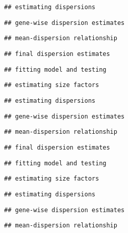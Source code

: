\documentclass[
]{article}
\begin{document}
\begin{verbatim}
## estimating dispersions
\end{verbatim}

\begin{verbatim}
## gene-wise dispersion estimates
\end{verbatim}

\begin{verbatim}
## mean-dispersion relationship
\end{verbatim}

\begin{verbatim}
## final dispersion estimates
\end{verbatim}

\begin{verbatim}
## fitting model and testing
\end{verbatim}

\begin{verbatim}
## estimating size factors
\end{verbatim}

\begin{verbatim}
## estimating dispersions
\end{verbatim}

\begin{verbatim}
## gene-wise dispersion estimates
\end{verbatim}

\begin{verbatim}
## mean-dispersion relationship
\end{verbatim}

\begin{verbatim}
## final dispersion estimates
\end{verbatim}

\begin{verbatim}
## fitting model and testing
\end{verbatim}

\begin{verbatim}
## estimating size factors
\end{verbatim}

\begin{verbatim}
## estimating dispersions
\end{verbatim}

\begin{verbatim}
## gene-wise dispersion estimates
\end{verbatim}

\begin{verbatim}
## mean-dispersion relationship
\end{verbatim}
\end{document}
